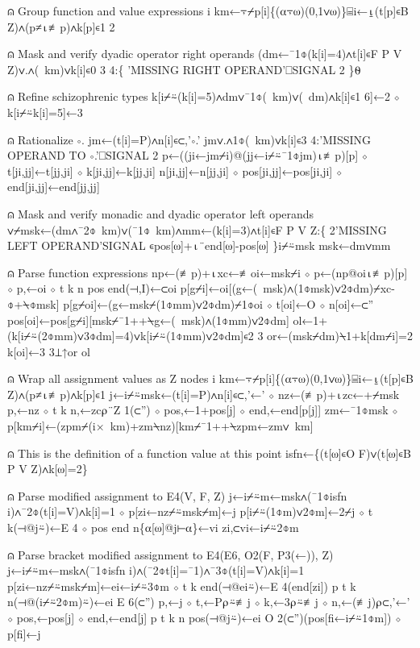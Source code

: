 \documentclass{article}%
\begin{document}
⍝ Group function and value expressions
         i km←⍪⌿p[i]\{(⍺⍪⍵)(0,1∨⍵)\}⌸i←⍸(t[p]∊B Z)∧(p≠⍳≢p)∧k[p]∊1 2

⍝ Mask and verify dyadic operator right operands
         (dm←¯1⌽(k[i]=4)∧t[i]∊F P V Z)∨.∧(~km)∨k[i]∊0 3 4:\{
                 'MISSING RIGHT OPERAND'⎕SIGNAL 2
         \}⍬

⍝ Refine schizophrenic types
         k[i⌿⍨(k[i]=5)∧dm∨¯1⌽(~km)∨(~dm)∧k[i]∊1 6]←2 ⋄ k[i⌿⍨k[i]=5]←3

⍝ Rationalize ∘.
         jm←(t[i]=P)∧n[i]∊⊂,'∘.'
         jm∨.∧1⌽(~km)∨k[i]∊3 4:'MISSING OPERAND TO ∘.'⎕SIGNAL 2
         p←((ji←jm⌿i)@(jj←i⌿⍨¯1⌽jm)⍳≢p)[p] ⋄ t[ji,jj]←t[jj,ji] ⋄ k[ji,jj]←k[jj,ji]
         n[ji,jj]←n[jj,ji] ⋄ pos[ji,jj]←pos[ji,ji] ⋄ end[ji,jj]←end[jj,jj]

⍝ Mask and verify monadic and dyadic operator left operands
         ∨⌿msk←(dm∧¯2⌽~km)∨(¯1⌽~km)∧mm←(k[i]=3)∧t[i]∊F P V Z:\{
                 2'MISSING LEFT OPERAND'SIGNAL ∊pos[⍵]+⍳¨end[⍵]-pos[⍵]
         \}i⌿⍨msk
         msk←dm∨mm

⍝ Parse function expressions
         np←(≢p)+⍳xc←≢oi←msk⌿i ⋄ p←(np@oi⍳≢p)[p] ⋄ p,←oi ⋄ t k n pos end(⊣,I)←⊂oi
         p[g⌿i]←oi[(g←(~msk)∧(1⌽msk)∨2⌽dm)⌿xc-⌽+⍀⌽msk]
         p[g⌿oi]←(g←msk⌿(1⌽mm)∨2⌽dm)⌿1⌽oi ⋄ t[oi]←O ⋄ n[oi]←⊂''
         pos[oi]←pos[g⌿i][msk⌿¯1++⍀g←(~msk)∧(1⌽mm)∨2⌽dm]
         ol←1+(k[i⌿⍨(2⌽mm)∨3⌽dm]=4)∨k[i⌿⍨(1⌽mm)∨2⌽dm]∊2 3
         or←(msk⌿dm)⍀1+k[dm⌿i]=2
         k[oi]←3 3⊥↑or ol

⍝ Wrap all assignment values as Z nodes
         i km←⍪⌿p[i]\{(⍺⍪⍵)(0,1∨⍵)\}⌸i←⍸(t[p]∊B Z)∧(p≠⍳≢p)∧k[p]∊1
         j←i⌿⍨msk←(t[i]=P)∧n[i]∊⊂,'←' ⋄ nz←(≢p)+⍳zc←+⌿msk
         p,←nz ⋄ t k n,←zc⍴¨Z 1(⊂'') ⋄ pos,←1+pos[j] ⋄ end,←end[p[j]]
         zm←¯1⌽msk ⋄ p[km⌿i]←(zpm⌿(i×~km)+zm⍀nz)[km⌿¯1++⍀zpm←zm∨~km]

⍝ This is the definition of a function value at this point
         isfn←\{(t[⍵]∊O F)∨(t[⍵]∊B P V Z)∧k[⍵]=2\}

⍝ Parse modified assignment to E4(V, F, Z)
         j←i⌿⍨m←msk∧(¯1⌽isfn i)∧¯2⌽(t[i]=V)∧k[i]=1 ⋄ p[zi←nz⌿⍨msk⌿m]←j
         p[i⌿⍨(1⌽m)∨2⌽m]←2⌿j ⋄ t k(⊣@j⍨)←E 4 ⋄ pos end n\{⍺[⍵]@j⊢⍺\}←vi zi,⊂vi←i⌿⍨2⌽m

⍝ Parse bracket modified assignment to E4(E6, O2(F, P3(←)), Z)
         j←i⌿⍨m←msk∧(¯1⌽isfn i)∧(¯2⌽t[i]=¯1)∧¯3⌽(t[i]=V)∧k[i]=1
         p[zi←nz⌿⍨msk⌿m]←ei←i⌿⍨3⌽m ⋄ t k end(⊣@ei⍨)←E 4(end[zi])
         p t k n(⊣@(i⌿⍨2⌽m)⍨)←ei E 6(⊂'')
         p,←j ⋄ t,←P⍴⍨≢j ⋄ k,←3⍴⍨≢j ⋄ n,←(≢j)⍴⊂,'←' ⋄ pos,←pos[j] ⋄ end,←end[j]
         p t k n pos(⊣@j⍨)←ei O 2(⊂'')(pos[fi←i⌿⍨1⌽m]) ⋄ p[fi]←j
\end{document}
